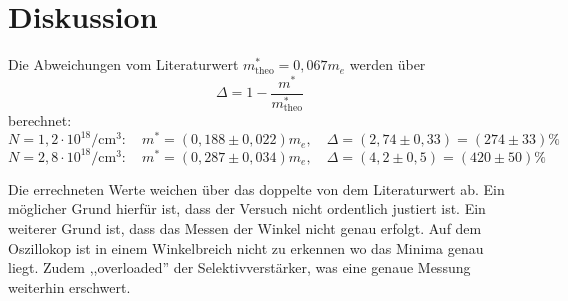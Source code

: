 \section{Diskussion}
\label{sec:Diskussion}
Die Abweichungen vom Literaturwert $m^*_\text{theo} = 0,067 m_e$ \cite{Galliumarsenid_me}
werden über 
\begin{equation*}
   \Delta =  1 - \frac{m^*}{m^*_\text{theo} }
\end{equation*}
\noindent berechnet:
\begin{equation*}
    N = 1,2 \cdot 10^{18} \si{\per\cubic\cm}: 
    \quad m^*=  (0,188 \pm 0,022 )m_e,
    \quad \Delta = (2,74 \pm 0,33) = (274 \pm 33) \%
\end{equation*}
\begin{equation*}
    N = 2,8 \cdot 10^{18} \si{\per\cubic\cm}: 
    \quad m^*= (0,287 \pm 0,034 )m_e,
    \quad \Delta = (4,2 \pm 0,5) = (420 \pm 50) \%
\end{equation*}

\noindent Die errechneten Werte weichen über das doppelte von dem Literaturwert ab.
Ein möglicher Grund hierfür ist, 
dass der Versuch nicht ordentlich justiert ist.
Ein weiterer Grund ist, 
dass das Messen der Winkel nicht genau  erfolgt.
Auf dem Oszillokop ist in einem Winkelbreich nicht zu erkennen wo das Minima genau liegt.
Zudem ,,overloaded'' der Selektivverstärker, was eine genaue Messung weiterhin erschwert.